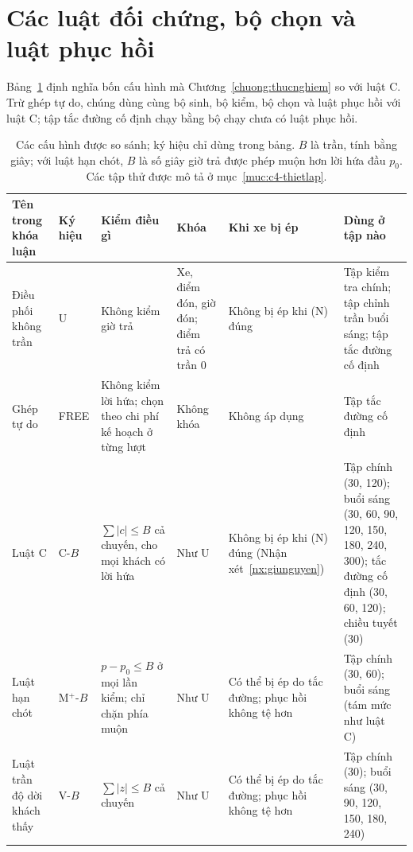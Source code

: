 \section{Các luật đối chứng, bộ chọn và luật phục hồi}
\label{muc:doichung}

Bảng~\ref{bang:luat} định nghĩa bốn cấu hình mà Chương~\ref{chuong:thucnghiem} so với luật C. Trừ ghép tự do,
chúng dùng cùng bộ sinh, bộ kiểm, bộ chọn và luật phục hồi với luật C; tập tắc đường cố định chạy bằng bộ chạy
chưa có luật phục hồi.

\begin{table}[htbp]
\centering
\caption[Các cấu hình được so sánh]{Các cấu hình được so sánh; ký hiệu chỉ dùng trong bảng. $B$ là trần, tính bằng giây; với luật hạn chót,
$B$ là số giây giờ trả được phép muộn hơn lời hứa đầu $p_0$. Các tập thử được mô tả ở mục~\ref{muc:c4-thietlap}.}
\label{bang:luat}
\footnotesize
\setlength{\tabcolsep}{3pt}
\begin{tabular}{@{}p{2.2cm}p{1.1cm}p{3.1cm}p{2.3cm}p{2.6cm}p{3.5cm}@{}}
\toprule
\textbf{Tên trong khóa luận} & \textbf{Ký hiệu} & \textbf{Kiểm điều gì} & \textbf{Khóa} & \textbf{Khi xe bị
ép} & \textbf{Dùng ở tập nào}\\
\midrule
Điều phối không trần & U & Không kiểm giờ trả & Xe, điểm đón, giờ đón; điểm trả có trần 0 & Không bị ép khi (N)
đúng & Tập kiểm tra chính; tập chỉnh trần buổi sáng; tập tắc đường cố định\\
Ghép tự do & FREE & Không kiểm lời hứa; chọn theo chi phí kế hoạch ở từng lượt & Không khóa & Không áp dụng &
Tập tắc đường cố định\\
Luật C & C-$B$ & $\sum |c| \le B$ cả chuyến, cho mọi khách có lời hứa & Như U & Không bị ép khi (N) đúng
(Nhận xét~\ref{nx:giunguyen}) & Tập chính (30, 120); buổi sáng (30, 60, 90, 120, 150, 180, 240, 300); tắc đường
cố định (30, 60, 120); chiều tuyết (30)\\
Luật hạn chót & M$^{+}$-$B$ & $p - p_0 \le B$ ở mọi lần kiểm; chỉ chặn phía muộn & Như U & Có thể bị ép do tắc
đường; phục hồi không tệ hơn & Tập chính (30, 60); buổi sáng (tám mức như luật C)\\
Luật trần độ dời khách thấy & V-$B$ & $\sum |z| \le B$ cả chuyến & Như U & Có thể bị ép do tắc đường; phục hồi
không tệ hơn & Tập chính (30); buổi sáng (30, 90, 120, 150, 180, 240)\\
\bottomrule
\end{tabular}
\end{table}

